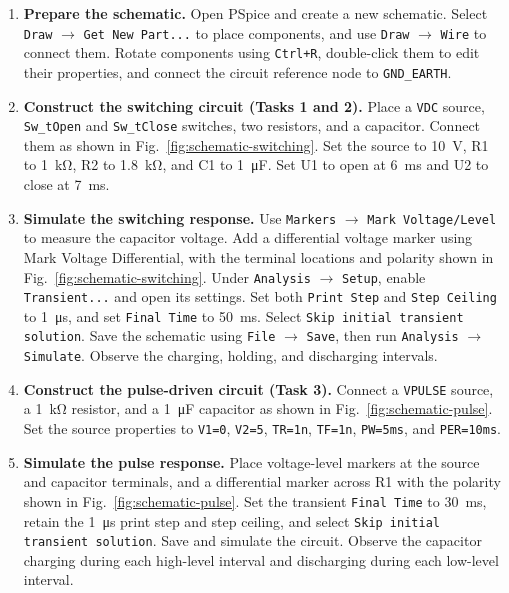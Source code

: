 \documentclass[12pt,a4paper]{article}
\begin{document}
	\begin{enumerate}[label=\arabic*., leftmargin=2.5em, itemsep=6pt]
		\item \textbf{Prepare the schematic.}
		Open PSpice and create a new schematic.  Select
		\texttt{Draw} $\rightarrow$ \texttt{Get New Part...} to place
		components, and use \texttt{Draw} $\rightarrow$ \texttt{Wire}
		to connect them.  Rotate components using \texttt{Ctrl+R},
		double-click them to edit their properties, and connect the
		circuit reference node to \texttt{GND\_EARTH}.
		
		\item \textbf{Construct the switching circuit (Tasks 1 and 2).}
		Place a \texttt{VDC} source, \texttt{Sw\_tOpen} and
		\texttt{Sw\_tClose} switches, two resistors, and a capacitor.
		Connect them as shown in Fig.~\ref{fig:schematic-switching}.
		Set the source to \SI{10}{\volt}, R1 to \SI{1}{\kilo\ohm},
		R2 to \SI{1.8}{\kilo\ohm}, and C1 to
		\SI{1}{\micro\farad}.  Set U1 to open at
		\SI{6}{\milli\second} and U2 to close at
		\SI{7}{\milli\second}.
		
		\item \textbf{Simulate the switching response.}
		Use \texttt{Markers} $\rightarrow$ \texttt{Mark Voltage/Level}
		to measure the capacitor voltage.  Add a differential voltage
		marker using \textnormal{Mark Voltage Differential}, with the
		terminal locations and polarity shown in
		Fig.~\ref{fig:schematic-switching}.  Under
		\texttt{Analysis} $\rightarrow$ \texttt{Setup}, enable
		\texttt{Transient...} and open its settings.  Set both
		\texttt{Print Step} and \texttt{Step Ceiling} to
		\SI{1}{\micro\second}, and set \texttt{Final Time} to
		\SI{50}{\milli\second}.  Select
		\texttt{Skip initial transient solution}.  Save the schematic
		using \texttt{File} $\rightarrow$ \texttt{Save}, then run
		\texttt{Analysis} $\rightarrow$ \texttt{Simulate}.
		Observe the charging, holding, and discharging intervals.
		
		\item \textbf{Construct the pulse-driven circuit (Task 3).}
		Connect a \texttt{VPULSE} source, a \SI{1}{\kilo\ohm}
		resistor, and a \SI{1}{\micro\farad} capacitor as shown in
		Fig.~\ref{fig:schematic-pulse}.  Set the source properties to
		\texttt{V1=0}, \texttt{V2=5}, \texttt{TR=1n},
		\texttt{TF=1n}, \texttt{PW=5ms}, and \texttt{PER=10ms}.
		
		\item \textbf{Simulate the pulse response.}
		Place voltage-level markers at the source and capacitor
		terminals, and a differential marker across R1 with the
		polarity shown in Fig.~\ref{fig:schematic-pulse}.
		Set the transient \texttt{Final Time} to
		\SI{30}{\milli\second}, retain the \SI{1}{\micro\second}
		print step and step ceiling, and select
		\texttt{Skip initial transient solution}.  Save and simulate
		the circuit.  Observe the capacitor charging during each
		high-level interval and discharging during each low-level
		interval.
		

\end{enumerate}
\end{document}
